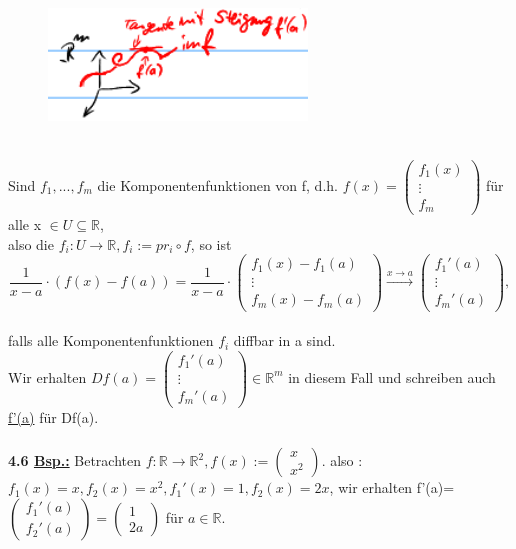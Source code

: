 \documentclass[]{scrartcl}
\begin{document}
	\begin{figure}[h]
		\includegraphics[width=7 cm,height=3cm]{bsp kap 4.5}
	\end{figure}\\
	Sind $f_1,...,f_m$ die Komponentenfunktionen von f, d.h. $f(x)=\begin{pmatrix}
		f_1(x)\\ \vdots \\f_m
	\end{pmatrix}$ für alle x $\in$\underline{$U\subseteq\mathbb{R}$},\\
	also die $f_i:U\rightarrow\mathbb{R}, f_i:=pr_i \circ f$, so ist\\
	\begin{equation}
		\frac{1}{x-a}\cdot(f(x)-f(a))=\frac{1}{x-a}\cdot\begin{pmatrix}
			f_1(x)-f_1(a)\\ \vdots \\ f_m(x)-f_m(a)
		\end{pmatrix} \xrightarrow{x\rightarrow a}\begin{pmatrix}
		f_1'(a)\\ \vdots \\ f_m'(a)
		\end{pmatrix},
	\end{equation}\\
	falls alle Komponentenfunktionen $f_i$ diffbar in a sind.\\
	Wir erhalten $Df(a)=\begin{pmatrix}
		f_1'(a)\\ \vdots \\f_m'(a)
	\end{pmatrix} \in \mathbb{R}^m$ in diesem Fall und schreiben auch  \ul{f'(a)} für Df(a).\\
	\\
	\textbf{4.6 \underline{Bsp.:}} Betrachten $f:\mathbb{R}\rightarrow\mathbb{R}^2, f(x):=\begin{pmatrix}
		x\\x^2
	\end{pmatrix}.$ also :$f_1(x)=x, f_2(x)=x^2, f_1'(x)=1, f_2(x)=2x$, wir erhalten f'(a)=$\begin{pmatrix}
		f_1'(a)\\f_2'(a)
	\end{pmatrix}=\begin{pmatrix}
	1\\2a
	\end{pmatrix}$ für $a\in \mathbb{R}$.\\
\end{document}
